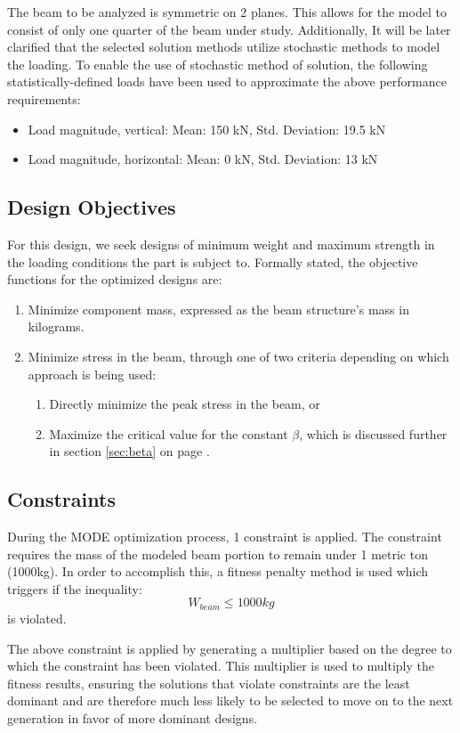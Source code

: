 The beam to be analyzed is symmetric on 2 planes. This allows for the model to consist of only one quarter of the beam under study. Additionally, It will be later clarified that the selected solution methods utilize stochastic methods to model the loading. To enable the use of stochastic method of solution, the following statistically-defined loads have been used to approximate the above performance requirements: 

\begin{itemize}
\item Load magnitude, vertical:   Mean: 150 kN, Std. Deviation: 19.5 kN
\item Load magnitude, horizontal: Mean: 0   kN, Std. Deviation: 13 kN
\end{itemize}

\subsection{Design Objectives}
For this design, we seek designs of minimum weight and maximum strength in the loading conditions the part is subject to. Formally stated, the objective functions for the optimized designs are: 

\begin{enumerate}
\item Minimize component mass, expressed as the beam structure's mass in kilograms. 
\item Minimize stress in the beam, through one of two criteria depending on which approach is being used: 
	\begin{enumerate}
	    \item Directly minimize the peak stress in the beam, or
	    \item Maximize the critical value for the constant $\beta$, which is discussed further in section \ref{sec:beta} on page \pageref{sec:beta}.
	\end{enumerate}
\end{enumerate}

\subsection{Constraints}
During the MODE optimization process, 1 constraint is applied. The constraint requires the mass of the modeled beam portion to remain under 1 metric ton (1000kg). In order to accomplish this, a fitness penalty method is used which triggers if the inequality:
$$
W_{beam} \leq 1000kg
$$
is violated. 

The above constraint is applied by generating a multiplier based on the degree to which the constraint has been violated. This multiplier is used to multiply the fitness results, ensuring the solutions that violate constraints are the least dominant and are therefore much less likely to be selected to move on to the next generation in favor of more dominant designs. 

